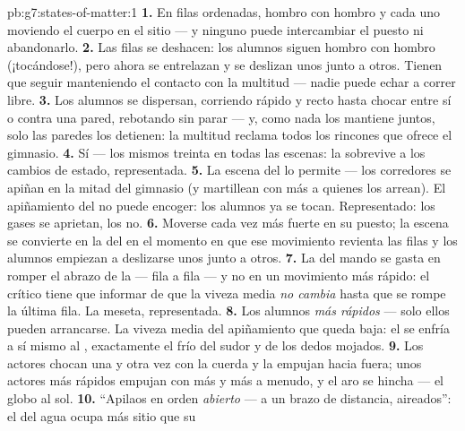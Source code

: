 \begin{solution}{pb:g7:states-of-matter:1}
\textbf{1.} En filas ordenadas, hombro con hombro y cada uno moviendo
el cuerpo en el sitio --- y ninguno puede intercambiar el puesto ni
abandonarlo.
\textbf{2.} Las filas se deshacen: los alumnos siguen hombro con
hombro (¡tocándose!), pero ahora se entrelazan y se deslizan unos
junto a otros. Tienen que seguir manteniendo el contacto con la
multitud --- nadie puede echar a correr libre.
\textbf{3.} Los alumnos se dispersan, corriendo rápido y recto hasta
chocar entre sí o contra una pared, rebotando sin parar --- y, como
nada los mantiene juntos, solo las paredes los detienen: la multitud
reclama todos los rincones que ofrece el gimnasio.
\textbf{4.} Sí --- los mismos treinta en todas las escenas: la
 sobrevive a los cambios de estado, representada.
\textbf{5.} La escena del  lo permite --- los corredores se
apiñan en la mitad del gimnasio (y martillean con más  a quienes
los arrean). El apiñamiento del  no puede encoger: los
alumnos ya se tocan. Representado: los gases se aprietan, los
 no.
\textbf{6.} Moverse cada vez más fuerte en su puesto; la escena se
convierte en la del  en el momento en que ese movimiento
revienta las filas y los alumnos empiezan a deslizarse unos junto a
otros.
\textbf{7.} La  del mando se gasta en romper el abrazo de la
 --- fila a fila --- y no en un movimiento más rápido: el crítico
 tiene que informar de que la viveza media \emph{no
cambia} hasta que se rompe la última fila. La meseta, representada.
\textbf{8.} Los alumnos \emph{más rápidos} --- solo ellos pueden
arrancarse. La viveza media del apiñamiento que queda baja: el
 se enfría a sí mismo al , exactamente el frío del
sudor y de los dedos mojados.
\textbf{9.} Los actores chocan una y otra vez con la cuerda y la
empujan hacia fuera; unos actores más rápidos empujan con más  y
más a menudo, y el aro se hincha --- el globo al sol.
\textbf{10.} ``Apilaos en orden \emph{abierto} --- a un brazo de
distancia, aireados'': el  del agua ocupa más sitio que su

\end{solution}
